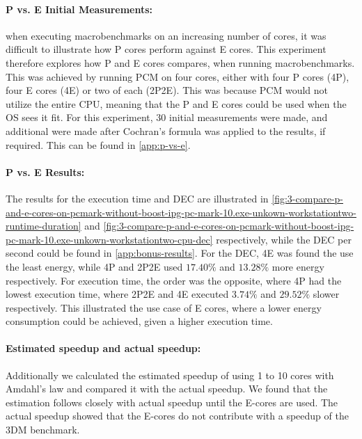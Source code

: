 

\paragraph{P vs. E Initial Measurements:} when executing macrobenchmarks on an increasing number of cores, it was difficult to illustrate how P cores perform against E cores. This experiment therefore explores how P and E cores compares, when running macrobenchmarks. This was achieved by running PCM on four cores, either with four P cores (4P), four E cores (4E) or two of each (2P2E). This was because PCM would not utilize the entire CPU, meaning that the P and E cores could be used when the OS sees it fit. For this experiment, $30$ initial measurements were made, and additional were made after Cochran's formula was applied to the results, if required. This can be found in \cref{app:p-vs-e}.



\paragraph{P vs. E Results:} The results for the execution time and DEC are illustrated in \cref{fig:3-compare-p-and-e-cores-on-pcmark-without-boost-ipg-pc-mark-10.exe-unkown-workstationtwo-runtime-duration} and  \cref{fig:3-compare-p-and-e-cores-on-pcmark-without-boost-ipg-pc-mark-10.exe-unkown-workstationtwo-cpu-dec} respectively, while the DEC per second could be found in \cref{app:bonus-results}. For the DEC, 4E was found the use the least energy, while 4P and 2P2E used $17.40\%$ and $13.28\%$ more energy respectively. For execution time, the order was the opposite, where 4P had the lowest execution time, where 2P2E and 4E executed $3.74\%$ and $29.52\%$ slower respectively. This illustrated the use case of E cores, where a lower energy consumption could be achieved, given a higher execution time.  



\paragraph*{Estimated speedup and actual speedup:}
Additionally we calculated the estimated speedup of using 1 to 10 cores with Amdahl's law and compared it with the actual speedup. We found that the estimation follows closely with actual speedup until the E-cores are used. The actual speedup showed that the E-cores do not contribute with a speedup of the 3DM benchmark.

